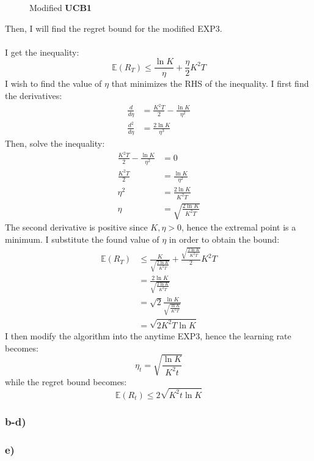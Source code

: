 \documentclass[a4paper]{article}
\newcommand{\expect}[1]{\mathbb{E}\left(#1\right)}
\begin{document}
\begin{figure}[ht]
\begin{algorithm}[H]
 \caption{Modified \textbf{UCB1}}
 \label{algo2}
 \DontPrintSemicolon
\end{algorithm}
\end{figure}
Then, I will find the regret bound for the modified EXP3.\\\\
I get the inequality:
\[
\expect{R_T} \leq \frac{\ln{K}}{\eta} + \frac{\eta}{2}K^2T
\]
I wish to find the value of $\eta$ that minimizes the RHS of the inequality.
I first find the derivatives:
\begin{align*}
  \frac{d}{d\eta} &= \frac{K^2T}{2} - \frac{\ln{K}}{\eta^2}\\
  \frac{d^2}{d\eta} &= \frac{2\ln{K}}{\eta^3}
\end{align*}
Then, solve the inequality:
\begin{align*}
  \frac{K^2T}{2} - \frac{\ln{K}}{\eta^2} &= 0\\
  \frac{K^2T}{2} &= \frac{\ln{K}}{\eta^2}\\
  \eta^2 &= \frac{2\ln{K}}{K^2T}\\
  \eta &= \sqrt{\frac{2\ln{K}}{K^2T}}
\end{align*}
The second derivative is positive since $K, \eta > 0$, hence the extremal point
is a minimum. I substitute the found value of $\eta$ in order to obtain the
bound:
\begin{align*}
  \expect{R_T} &\leq 
  \frac{K}{\sqrt{\frac{2\ln{K}}{K^2T}}} +
  \frac{\sqrt{\frac{2\ln{K}}{K^2T}}}{2} K^2T \\
  &= \frac{2\ln{K}}{\sqrt{\frac{2\ln{K}}{K^2T}}}\\
  &= \sqrt{2}\frac{\ln{K}}{\sqrt{\frac{\ln{K}}{K^2T}}}\\
  &= \sqrt{2 K^2 T \ln{K}}
\end{align*}
I then modify the algorithm into the anytime EXP3, hence the learning rate
becomes:
\[
  \eta_t = \sqrt{\frac{\ln{K}}{K^2t}}
\]
while the regret bound becomes:
\[
  \expect{R_t} \leq 2\sqrt{K^2 t \ln{K}}
\]

\subsubsection*{b-d)}

\subsubsection*{e)}
\end{document}
